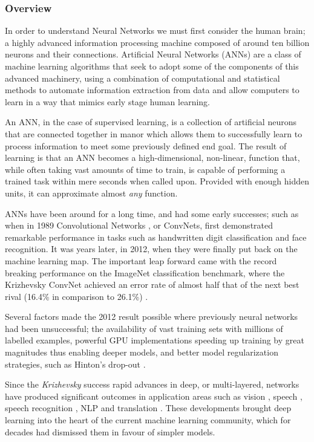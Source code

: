 \documentclass[a4paper,11pt,titlepage]{article}
\begin{document}
	\subsubsection{Overview}
		In order to understand Neural Networks we must first consider the human brain; a highly advanced information processing machine composed of around ten billion neurons and their connections. Artificial Neural Networks (ANNs) are a class of machine learning algorithms that seek to adopt some of the components of this advanced machinery, using a combination of computational and statistical methods to automate information extraction from data and allow computers to learn in a way that mimics early stage human learning.
			\par 
			An ANN, in the case of supervised learning, is a collection of artificial neurons that are connected together in manor which allows them to successfully learn to process information to meet some previously defined end goal. The result of learning is that an ANN becomes a high-dimensional, non-linear, function that, while often taking vast amounts of time to train, is capable of performing a trained task within mere seconds when called upon. Provided with enough hidden units, it can approximate almost \textit{any} function. 
			\par
			ANNs have been around for a long time, and had some early successes; such as when in 1989 Convolutional Networks \cite{LeCun1989}, or ConvNets, first demonstrated remarkable performance in tasks such as handwritten digit classification and face recognition. It was years later, in 2012, when they were finally put back on the machine learning map. The important leap forward came with the record breaking performance on the ImageNet classification benchmark, where the Krizhevsky ConvNet achieved an error rate of almost half that of the next best rival (16.4\% in comparison to 26.1\%) \cite{Krizhevsky2012}.
			\par
			Several factors made the 2012 result possible where previously neural networks had been unsuccessful; the availability of vast training sets with millions of labelled examples, powerful GPU implementations speeding up training by great magnitudes thus enabling deeper models, and better model regularization strategies, such as Hinton's drop-out \cite{Hinton2012}.
			\par 
			Since the \textit{Krizhevsky} success rapid advances in deep, or multi-layered, networks have produced significant outcomes in application areas such as vision \cite{Russakovsky2015}, speech \cite{Sutskever2014}, speech recognition \cite{Sainath2015}, NLP \cite{Norouzi2014} and  translation \cite{Graves2014}. These developments brought deep learning into the heart of the current machine learning community, which for decades had dismissed them in favour of simpler models.
\\\
\end{document}
